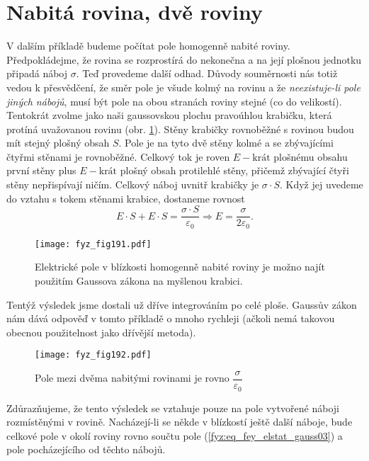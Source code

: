 {\section{Nabitá rovina, dvě roviny}\label{fyz:IIchapVsecV}
  V dalším příkladě budeme počítat pole homogenně nabité roviny. Předpokládejme, že rovina se 
  rozprostírá do nekonečna a na její plošnou jednotku připadá náboj \(\sigma\). Teď provedeme 
  další odhad. Důvody souměrnosti nás totiž vedou k přesvědčení, že směr pole je všude kolmý na 
  rovinu a že \emph{neexistuje-li pole jiných nábojů}, musí být pole na obou stranách roviny 
  stejné (co do velikostí). Tentokrát zvolme jako naši gaussovskou plochu pravoúhlou krabičku, 
  která protíná uvažovanou rovinu (obr. \ref{fyz:fig191}). Stěny krabičky rovnoběžné s rovinou 
  budou mít stejný plošný obsah \(S\). Pole je na tyto dvě stěny kolmé a se zbývajícími čtyřmi 
  stěnami je rovnoběžné. Celkový tok je roven \(E-\text{krát}\) plošnému obsahu první stěny plus 
  \(E-\text{krát}\) plošný obsah protilehlé stěny, přičemž zbývající čtyři stěny nepřispívají 
  ničím. Celkový náboj uvnitř krabičky je \(\sigma\cdot S\). Když jej uvedeme do vztahu s tokem 
  stěnami krabice, dostaneme rovnost
  \begin{equation}\label{fyz:eq_fey_elstat_gauss03}
    E\cdot S + E\cdot S = \frac{\sigma\cdot S}{\varepsilon_0} \Rightarrow 
    E = \frac{\sigma}{2\varepsilon_0}.
  \end{equation}
  
  \begin{figure}[ht!] %
    \centering
    \texttt{[image: fyz\_fig191.pdf]}
    \caption{Elektrické pole v blízkosti homogenně nabité roviny je možno najít použitím   
             Gaussova zákona na myšlenou krabici.}
    \label{fyz:fig191}
  \end{figure}
  
  Tentýž výsledek jsme dostali už dříve integrováním po celé ploše. Gaussův zákon nám dává 
  odpověď v tomto příkladě o mnoho rychleji (ačkoli nemá takovou obecnou použitelnost jako 
  dřívější metoda).

  \begin{figure}[ht!]  %
    \centering
    \texttt{[image: fyz\_fig192.pdf]}
    \caption{Pole mezi dvěma nabitými rovinami je rovno \(\dfrac{\sigma}{\varepsilon_0}\)}
    \label{fyz:fig192}
  \end{figure}
  Zdůrazňujeme, že tento výsledek se vztahuje pouze na pole vytvořené náboji rozmístěnými v 
  rovině. Nacházejí-li se někde v blízkostí ještě další náboje, bude celkové pole v okolí 
  roviny rovno součtu pole (\ref{fyz:eq_fey_elstat_gauss03}) a pole pocházejícího od těchto 
  nábojů.
   
}
